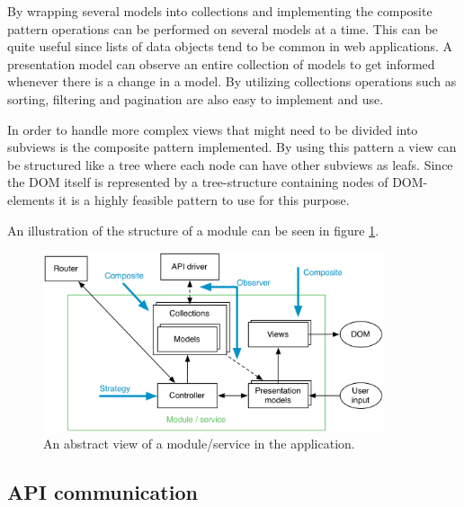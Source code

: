 By wrapping several models into collections and implementing the composite pattern operations can be performed on several models at a time. This can be quite useful since lists of data objects tend to be common in web applications. A presentation model can observe an entire collection of models to get informed whenever there is a change in a model. By utilizing collections operations such as sorting, filtering and pagination are also easy to implement and use.

In order to handle more complex views that might need to be divided into subviews is the composite pattern implemented. By using this pattern a view can be structured like a tree where each node can have other subviews as leafs. Since the DOM itself is represented by a tree-structure containing nodes of DOM-elements it is a highly feasible pattern to use for this purpose.


An illustration of the structure of a module can be seen in figure \ref{fig:arch_module}.

\begin{figure}[h!]
	\centerline{\includegraphics[width=100mm]{gfx/system_design_module.png}}
	\caption{An abstract view of a module/service in the application.}
	\label{fig:arch_module}
\end{figure}

\subsection{API communication}

